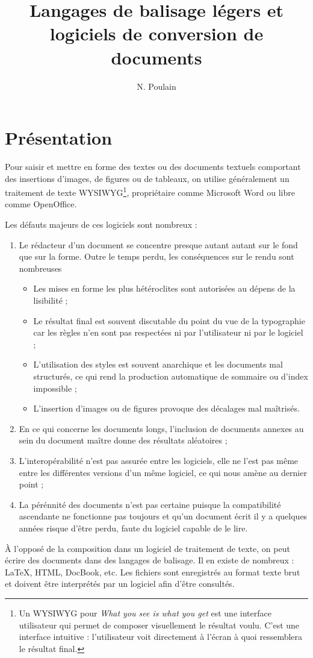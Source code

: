 \documentclass[]{article}
\title{Langages de balisage légers et logiciels de conversion de documents}
\author{N. Poulain}
\begin{document}
\maketitle

\section{Présentation}

Pour saisir et mettre en forme des textes ou des documents textuels
comportant des insertions d'images, de figures ou de tableaux, on
utilise généralement un traitement de texte WYSIWYG\footnote{Un WYSIWYG
  pour \emph{What you see is what you get} est une interface utilisateur
  qui permet de composer visuellement le résultat voulu. C'est une
  interface intuitive : l'utilisateur voit directement à l'écran à quoi
  ressemblera le résultat final.}, propriétaire comme Microsoft Word ou
libre comme OpenOffice.

Les défauts majeurs de ces logiciels sont nombreux :

\begin{enumerate}[1.]
\item
  Le rédacteur d'un document se concentre presque autant autant sur le
  fond que sur la forme. Outre le temps perdu, les conséquences sur le
  rendu sont nombreuses
  \begin{itemize}
  \item
    Les mises en forme les plus hétéroclites sont autorisées au dépens
    de la lisibilité ;
  \item
    Le résultat final est souvent discutable du point du vue de la
    typographie car les règles n'en sont pas respectées ni par
    l'utilisateur ni par le logiciel ;
  \item
    L'utilisation des styles est souvent anarchique et les documents mal
    structurés, ce qui rend la production automatique de sommaire ou
    d'index impossible ;
  \item
    L'insertion d'images ou de figures provoque des décalages mal
    maîtrisés.
  \end{itemize}
\item
  En ce qui concerne les documents longs, l'inclusion de documents
  annexes au sein du document maître donne des résultats aléatoires ;
\item
  L'interopérabilité n'est pas assurée entre les logiciels, elle ne
  l'est pas même entre les différentes versions d'un même logiciel, ce
  qui nous amène au dernier point ;
\item
  La pérénnité des documents n'est pas certaine puisque la compatibilité
  ascendante ne fonctionne pas toujours et qu'un document écrit il y a
  quelques années risque d'être perdu, faute du logiciel capable de le
  lire.
\end{enumerate}
À l'opposé de la composition dans un logiciel de traitement de texte, on
peut écrire des documents dans des langages de balisage. Il en existe de
nombreux : LaTeX, HTML, DocBook, etc. Les fichiers sont enregistrés au
format texte brut et doivent être interprétés par un logiciel afin
d'être consultés.
\end{document}
